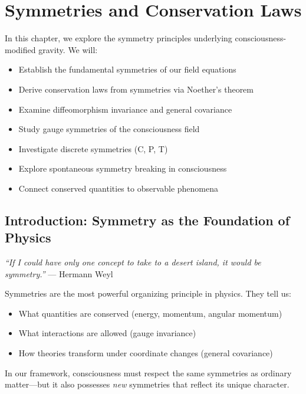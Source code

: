 \chapter{Symmetries and Conservation Laws}
\label{ch:symmetries-conservation}

\begin{chapterobjectives}
In this chapter, we explore the symmetry principles underlying consciousness-modified gravity. We will:
\begin{itemize}
\item Establish the fundamental symmetries of our field equations
\item Derive conservation laws from symmetries via Noether's theorem
\item Examine diffeomorphism invariance and general covariance
\item Study gauge symmetries of the consciousness field
\item Investigate discrete symmetries (C, P, T)
\item Explore spontaneous symmetry breaking in consciousness
\item Connect conserved quantities to observable phenomena
\end{itemize}
\end{chapterobjectives}

\section{Introduction: Symmetry as the Foundation of Physics}

\begin{intuitive}
\textit{``If I could have only one concept to take to a desert island, it would be symmetry.''} --- Hermann Weyl

Symmetries are the most powerful organizing principle in physics. They tell us:
\begin{itemize}
\item What quantities are conserved (energy, momentum, angular momentum)
\item What interactions are allowed (gauge invariance)
\item How theories transform under coordinate changes (general covariance)
\end{itemize}

In our framework, consciousness must respect the same symmetries as ordinary matter---but it also possesses \textit{new} symmetries that reflect its unique character.
\end{intuitive}

